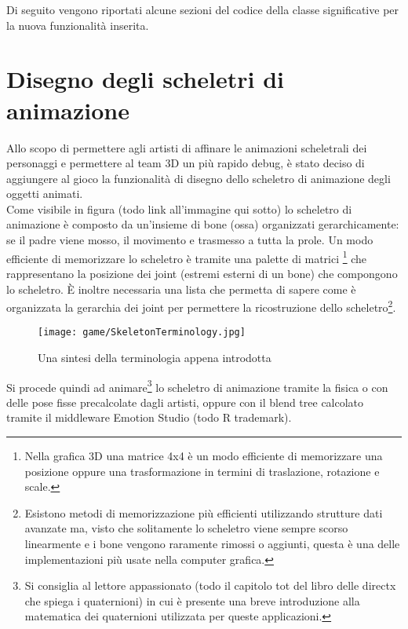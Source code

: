 	Di seguito vengono riportati alcune sezioni del codice della classe significative per la nuova funzionalità inserita.
	
	
	
	
	
	

\section{Disegno degli scheletri di animazione}
	
	Allo scopo di permettere agli artisti di affinare le animazioni scheletrali dei personaggi e permettere al team 3D un più rapido debug, è stato deciso di aggiungere al gioco la funzionalità di disegno dello scheletro di animazione degli oggetti animati.\\
	
	Come visibile in figura (todo link all'immagine qui sotto) lo scheletro di animazione è composto da un'insieme di bone (ossa) organizzati gerarchicamente: se il padre viene mosso, il movimento e trasmesso a tutta la prole. Un modo efficiente di memorizzare lo scheletro è tramite una palette di matrici \footnote{Nella grafica 3D una matrice 4x4 è un modo efficiente di memorizzare una posizione oppure una trasformazione in termini di traslazione, rotazione e scale.} che rappresentano la posizione dei joint (estremi esterni di un bone) che compongono lo scheletro. È inoltre necessaria una lista che permetta di sapere come è organizzata la gerarchia dei joint per permettere la ricostruzione dello scheletro\footnote{Esistono metodi di memorizzazione più efficienti utilizzando strutture dati avanzate ma, visto che solitamente lo scheletro viene sempre scorso linearmente e i bone vengono raramente rimossi o aggiunti, questa è una delle implementazioni più usate nella computer grafica.}.\\
	
	\begin{figure}[h!] 
		\centering 
		\texttt{[image: game/SkeletonTerminology.jpg]} 
		\caption{Una sintesi della terminologia appena introdotta}
	\end{figure}
	
	
	Si procede quindi ad animare\footnote{Si consiglia al lettore appassionato (todo il capitolo tot del libro delle directx che spiega i quaternioni) in cui è presente una breve introduzione alla matematica dei quaternioni utilizzata per queste applicazioni.} lo scheletro di animazione tramite la fisica o con delle pose fisse precalcolate dagli artisti, oppure con il blend tree calcolato tramite il middleware Emotion Studio (todo R trademark).\\
	
